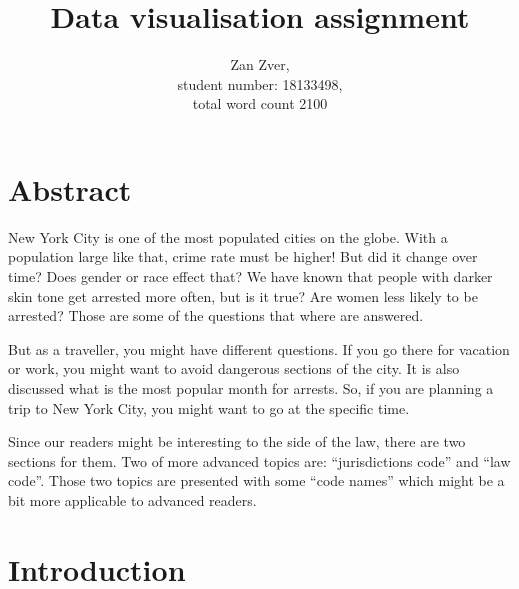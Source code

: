 \documentclass{article}\usepackage[]{graphicx}\usepackage[]{color}
\title{Data visualisation assignment }
\author{Zan Zver,\\ 
        student number: 18133498,\\
        total word count 2100}
\begin{document}
\maketitle

\newpage
  \tableofcontents
\newpage
  \listoffigures
\newpage
 \maketitle
  \newpage
    \section{Abstract} 
      New York City is one of the most populated cities on the globe. With a population large like that,        crime rate must be higher! But did it change over time? Does gender or race effect that? We have          known that people with darker skin tone get arrested more often, but is it true? Are women less           likely to be arrested? Those are some of the questions that where are answered.\vspace{5mm}
      
      But as a traveller, you might have different questions. If you go there for vacation or work, you         might want to avoid dangerous sections of the city. It is also discussed what is the most popular         month for arrests. So, if you are planning a trip to New York City, you might want to go at the           specific time.\vspace{5mm}
      
      Since our readers might be interesting to the side of the law, there are two sections for them. Two       of more advanced topics are: “jurisdictions code” and “law code”. Those two topics are presented          with some “code names” which might be a bit more applicable to advanced readers.\vspace{5mm}


  \maketitle
    \newpage
      \section{Introduction} 
\end{document}
